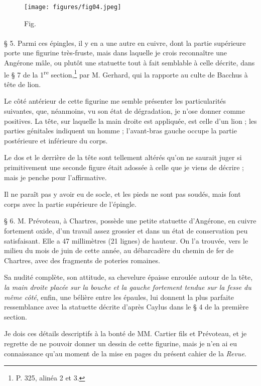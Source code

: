 \documentclass[a4paper, 11pt, oneside, polutonikogreek, french]{article}
\begin{document}
\begin{figure}[H]
\centering
\texttt{[image: figures/fig04.jpeg]}
\caption{Fig.}
\end{figure}
\paragraph{}
§ 5. Parmi ces épingles, il y en a une autre en cuivre, dont la partie supérieure porte une figurine très-fruste, mais dans laquelle je crois reconnaître une Angérone mâle, ou plutôt une statuette tout à fait semblable à celle décrite, dans le § 7 de la 1\textsuperscript{re} section,\footnote{P. 325, alinéa 2 et 3.} par M. Gerhard, qui la rapporte au culte de Bacchus à tête de lion.

Le côté antérieur de cette figurine me semble présenter les particularités suivantes, que, néanmoins, vu son état de dégradation, je n'ose donner comme positives. La tête, sur laquelle la main droite est appliquée, est celle d'un lion ; les parties génitales indiquent un homme ; l'avant-bras gauche occupe la partie postérieure et inférieure du corps.

Le dos et le derrière de la tête sont tellement altérés qu'on ne saurait juger si primitivement une seconde figure était adossée à celle que je viens de décrire ; mais je penche pour l'affirmative.

Il ne paraît pas y avoir eu de socle, et les pieds ne sont pas soudés, mais font corps avec la partie supérieure de l'épingle.

§ 6. M. Prévoteau, à Chartres, possède une petite statuette d'Angérone, en cuivre fortement oxide, d'un travail assez grossier et dans un état de conservation peu satisfaisant. Elle a 47 millimètres (21 lignes) de hauteur. On l'a trouvée, vers le milieu du mois de juin de cette année, au débarcadère du chemin de fer de Chartres, avec des fragments de poteries romaines.

Sa nudité complète, son attitude, sa chevelure épaisse enroulée autour de la tête, \emph{la main droite placée sur la bouche et la gauche fortement tendue sur la fesse du même côté}, enfin, une bélière entre les épaules, lui donnent la plus parfaite ressemblance avec la statuette décrite d'après Caylus dans le § 4 de la première section.

Je dois ces détails descriptifs à la bonté de MM. Cartier fils et Prévoteau, et je regrette de ne pouvoir donner un dessin de cette figurine, mais je n'en ai eu connaissance qu'au moment de la mise en pages du présent cahier de la \emph{Revue}.
\end{document}
